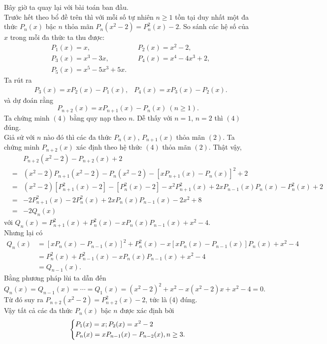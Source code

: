 \begin{bt}
{		Bây giờ ta quay lại với bài toán ban đầu.\\
		Trước hết theo bổ đề trên thì với mỗi số tự nhiên $ n\geq 1 $ tồn tại duy nhất một đa thức $ P_{n}(x) $ bậc $ n $ thỏa mãn $ P_{n}(x^{2}-2)=P_{n}^{2}(x)-2 $. So sánh các hệ số của $ x $ trong mỗi đa thức ta thu được:
		\begin{align*}
		&P_{1}(x)=x,&&P_{2}(x)=x^{2}-2,\\
		&P_{3}(x)=x^{3}-3x,&&P_{4}(x)=x^{4}-4x^{3}+2,\\
		&P_{5}(x)=x^{5}-5x^{3}+5x.
		\end{align*}
		Ta rút ra 
		\begin{align*}
		&P_{3}(x)=xP_{2}(x)-P_{1}(x),
		&P_{4}(x)=xP_{3}(x)-P_{2}(x).
		\end{align*}
		và dự đoán rằng
		\[ 
		P_{n+2}(x)=xP_{n+1}(x)-P_{n}(x)\ (n\geq 1).\tag{4}
		\]
		Ta chứng minh $ (4) $ bằng quy nạp theo $ n $. Dễ thấy với $ n=1 $, $ n=2 $ thì $ (4) $ đúng.\\
		Giả sử với $ n $ nào đó thì các đa thức $ P_{n}(x) $, $ P_{n+1}(x) $ thỏa mãn $ (2) $. Ta chứng minh $ P_{n+2}(x) $ xác định theo hệ thức $(4)$ thỏa mãn $ (2) $. Thật vậy,
		\begin{eqnarray*}
			&&P_{n+2}(x^{2}-2)-P_{n+2}(x)+2\\
			&=&(x^{2}-2)P_{n+1}(x^{2}-2)-P_{n}(x^{2}-2)-\left[xP_{n+1}(x)-P_{n}(x)\right]^{2}+2\\
			&=&(x^{2}-2)\left[P_{n+1}^{2}(x)-2\right]-\left[P_{n}^{2}(x)-2\right]-x^{2}P_{n+1}^{2}(x)+2xP_{n-1}(x)P_{n}(x)-P_{n}^{2}(x)+2\\
			&=&-2P_{n+1}^{2}(x)-2P_{n}^{2}(x)+2xP_{n}(x)P_{n-1}(x)-2x^{2}+8\\
			&=&-2Q_{n}(x)
		\end{eqnarray*}
		với $ Q_{n}(x)=P_{n+1}^{2}(x)+P_{n}^{2}(x)-xP_{n}(x)P_{n-1}(x)+x^{2}-4 $.\\
		Nhưng lại có
		\begin{align*}
		Q_{n}(x)&=\left[xP_{n}(x)-P_{n-1}(x)\right]^{2}+P_{n}^{2}(x)-x\left[xP_{n}(x)-P_{n-1}(x)\right]P_{n}(x)+x^{2}-4\\
		&=P_{n}^{2}(x)+P_{n-1}^{2}(x)-xP_{n}(x)P_{n-1}(x)+x^{2}-4\\
		&=Q_{n-1}(x).
		\end{align*}
		Bằng phương pháp lùi ta dẫn đến 
		\[ 
		Q_{n}(x)=Q_{n-1}(x)=\cdots=Q_{1}(x)=(x^{2}-2)^{2}+x^{2}-x(x^{2}-2)x+x^{2}-4=0.
		\]
		Từ đó suy ra $ P_{n+2}(x^{2}-2)=P_{n+2}^{2}(x)-2 $, tức là ($ 4 $) đúng.\\
		Vậy tất cả các đa thức $ P_{n}(x) $ bậc $ n $ được xác định bởi 
		\[ 
		\left\{\begin{aligned}&P_{1}(x)=x;P_{2}(x)=x^{2}-2\\ &P_{n}(x)=xP_{n-1}(x)-P_{n-2}(x),n\geq 3.\end{aligned}\right.
		\]
	}
\end{bt}

